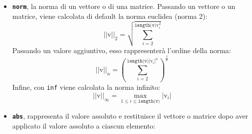 \documentclass[a4paper]{article}
\begin{document}
\begin{itemize}
        \item \texttt{\textbf{norm}}, la norma di un vettore o di una matrice. Passando un vettore o un matrice, viene calcolata di default la norma euclidea (norma 2):
        \begin{equation*}
            \left|\left| \mathrm{v} \right|\right|_{2} = \sqrt{\sum_{i = 2}^{\texttt{length(v)} \mathrm{v}_{i}^{2}}}
        \end{equation*}
        Passando un valore aggiuntivo, esso rappresenterà l'ordine della norma:
        \begin{equation*}
            \left|\left| \mathrm{v} \right|\right|_{n} = \left( \sum_{i = 2}^{\texttt{length(v)} \left| \mathrm{v}_{i} \right|^{n}} \right)^{\frac{1}{n}}
        \end{equation*}
        Infine, con \texttt{inf} viene calcolata la norma infinito:
        \begin{equation*}
            \left|\left| \mathrm{v} \right|\right|_{\infty} = \underset{1 \le i \le \texttt{length(v)}}{\max} \left| \mathrm{v}_{i} \right|
        \end{equation*}
        

        \item \texttt{\textbf{abs}}, rappresenta il valore assoluto e restituisce il vettore o matrice dopo aver applicato il valore assoluto a ciascun elemento:
        
    \end{itemize}

    \newpage

    {}
    

    \newpage

    \printindex
\end{document}
